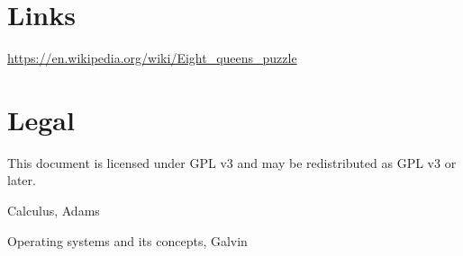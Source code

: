\documentclass[a4paper,11pt]{article}
\begin{document}
\section{Links}
\url{https://en.wikipedia.org/wiki/Eight_queens_puzzle}

\section{Legal}
This document is licensed under GPL v3 and may be redistributed as GPL v3 or later. 



\begin{thebibliography}{99}
	Calculus, 
	Adams
	
	Operating systems and its concepts,
	Galvin
\end{thebibliography}
\end{document}
